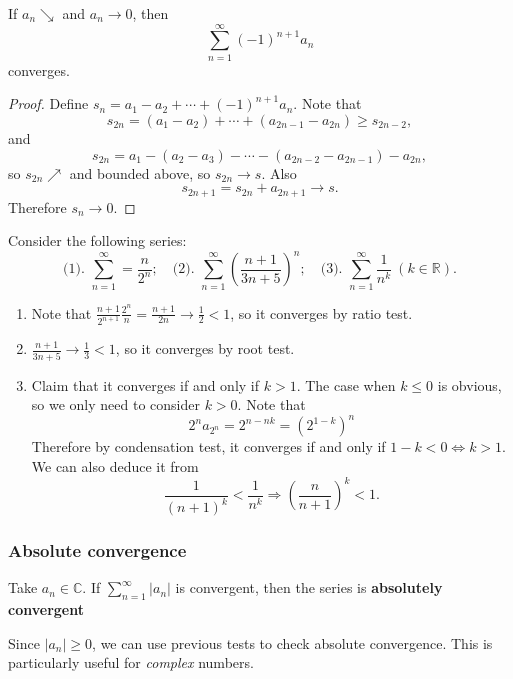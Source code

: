 \begin{theorem}\label{thm:Alternating series test}
    If $a_n\searrow$ and $a_n \to 0 $, then 
    \[
        \sum_{n=1}^{\infty}(-1)^{n+1}a_n
    \]
    converges.
\end{theorem}
\begin{proof}
    Define $ s_n = a_1-a_2+\cdots+(-1)^{n+1}a_n $. Note that 
    \[
        s_{2n} = (a_1-a_2)+\cdots+(a_{2n-1}-a_{2n})\ge s_{2n-2},
    \]
    and 
    \[
        s_{2n} = a_1 - (a_2-a_3)-\cdots-(a_{2n-2}-a_{2n-1}) - a_{2n},
    \]
    so $ s_{2n} \nearrow $ and bounded above, so $ s_{2n}\to s $. Also
    \[
        s_{2n+1}=s_{2n}+a_{2n+1}\to s.
    \]
    Therefore $ s_n\to 0 $.
\end{proof}

\begin{example}
    Consider the following series: 
    \[ 
        \text{(1). } \sum_{n=1}^{\infty} = \frac{n}{2^n};\quad \text{(2). } \sum_{n=1}^{\infty}\left( \frac{n+1}{3n+5} \right)^{n}; \quad \text{(3). } \sum_{n=1}^{\infty}\frac{1}{n^k}\ (k\in \mathbb{R}).
    \]

    \begin{enumerate}[(1).]
        \item Note that $ \frac{n+1}{2^{n+1}}\frac{2^n}{n}=\frac{n+1}{2n}\to \frac{1}{2}<1 $, so it converges by ratio test.
        \item $ \frac{n+1}{3n+5}\to \frac{1}{3}<1 $, so it converges by root test.
        \item Claim that it converges if and only if $k>1$. The case when $ k\le 0 $ is obvious, so we only need to consider $k>0$. Note that 
        \[
            2^na_{2^n} = 2^{n-nk}=(2^{1-k})^n
        \]
        Therefore by condensation test, it converges if and only if $ 1-k<0 \Leftrightarrow k>1 $. We can also deduce it from 
        \[
            \frac{1}{(n+1)^k}<\frac{1}{n^k} \Longrightarrow \left( \frac{n}{n+1} \right)^k<1.
        \]
    \end{enumerate}
\end{example}

\subsubsection*{Absolute convergence}
\begin{definition}
    Take $ a_n\in \mathbb{C}  $. If $ \sum_{n=1}^{\infty}|a_n| $ is convergent, then the series is \textbf{absolutely convergent}
\end{definition}
\begin{note}
    Since $ |a_n|\ge 0 $, we can use previous tests to check absolute convergence. This is particularly useful for \textit{complex} numbers.
\end{note}

